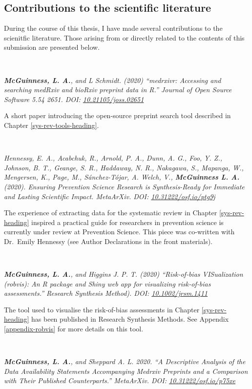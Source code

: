 \documentclass[a4paper, twoside]{templates/ociamthesis}
\begin{document}
\hypertarget{contributions-to-the-scientific-literature}{%
\subsection{Contributions to the scientific literature}\label{contributions-to-the-scientific-literature}}

During the course of this thesis, I have made several contributions to the scienitfic literature. Those arising from or directly related to the contents of this submission are presented below.

~

\emph{\textbf{McGuinness, L. A.}, and L Schmidt. (2020) ``medrxivr: Accessing and searching medRxiv and bioRxiv preprint data in R.'' Journal of Open Source Software 5.54 2651. DOI: \href{https://doi.org/10.21105/joss.02651}{10.21105/joss.02651}}

A short paper introducing the open-source preprint search tool described in Chapter \ref{sys-rev-tools-heading}.

~

\emph{Hennessy, E. A., Acabchuk, R., Arnold, P. A., Dunn, A. G., Foo, Y. Z., Johnson, B. T., Geange, S. R., Haddaway, N. R., Nakagawa, S., Mapanga, W., Mengersen, K., Page, M., Sánchez-Tójar, A. Welch, V., \textbf{McGuinness L. A.} (2020). Ensuring Prevention Science Research is Synthesis-Ready for Immediate and Lasting Scientific Impact. MetaArXiv. DOI: \href{https://doi.org/10.31222/osf.io/ptg9j}{10.31222/osf.io/ptg9j}}

The experience of extracting data for the systematic review in Chapter \ref{sys-rev-heading} inspired a practical guide for researchers in prevention science is currently under review at Prevention Science. This piece was co-written with Dr.~Emily Hennessy (see Author Declarations in the front materials).

~

\emph{\textbf{McGuinness, L. A.}, and Higgins J. P. T. (2020) ``Risk‐of‐bias VISualization (robvis): An R package and Shiny web app for visualizing risk‐of‐bias assessments.'' Research Synthesis Method). DOI: \href{https://doi.org/10.1002/jrsm.1411}{10.1002/jrsm.1411}}

The tool used to visualise the risk-of-bias assessments in Chapter \ref{sys-rev-heading} has been published in Research Synthesis Methods. See Appendix \ref{appendix-robvis} for more details on this tool.

~

\emph{\textbf{McGuinness, L. A.}, and Sheppard A. L. 2020. ``A Descriptive Analysis of the Data Availability Statements Accompanying Medrxiv Preprints and a Comparison with Their Published Counterparts.'' MetaArXiv. DOI: \href{https://doi.org/10.31222/osf.io/p75xe}{10.31222/osf.io/p75xe}}
\end{document}
